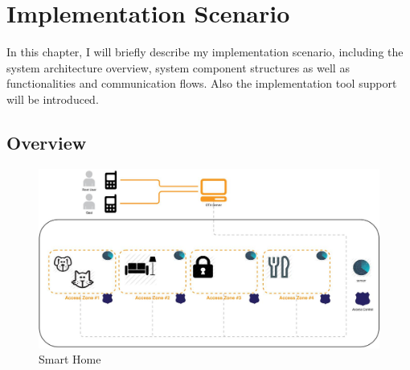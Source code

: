 \chapter{Implementation Scenario}

In this chapter, I will briefly describe my implementation scenario, including the system architecture overview, system component structures as well as functionalities and communication flows. Also the implementation tool support will be introduced.
\section{Overview}
 \begin{figure}[!htb]
	\centering
	\includegraphics[width=1\textwidth]{homeoverview.jpg}
		\caption{Smart Home}
	\label{fig:SmartHome}
\end{figure}

